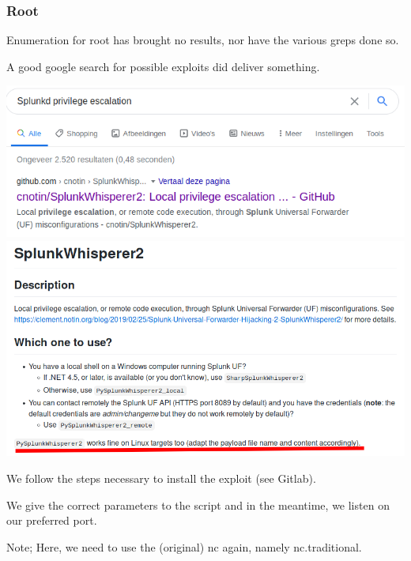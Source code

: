 \documentclass[../main.tex]{subfiles}
\begin{document}
\subsubsection{Root}

Enumeration for root has brought no results, nor have the various greps done so.

A good google search for possible exploits did deliver something.

\includegraphics[width=\linewidth]{images/Nicolai/doctor_google_splunk.png}
\includegraphics[width=\linewidth]{images/Nicolai/doctor_splunkd.png}

We follow the steps necessary to install the exploit (see Gitlab).

We give the correct parameters to the script and in the meantime, we listen on our preferred port.

Note; Here, we need to use the (original) nc again, namely nc.traditional.
\end{document}
